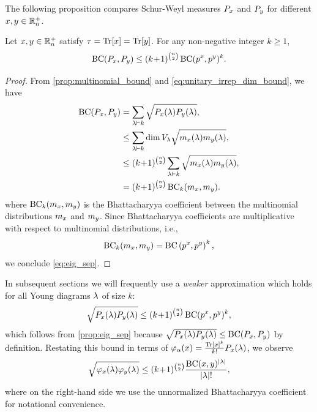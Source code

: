 \documentclass[notitlepage, 11pt, letterpaper]{amsart}
\begin{document}
The following proposition compares Schur-Weyl measures $P_{x}$ and $P_{y}$ for different $x, y \in \mathbb R^{+}_{n}$.
\begin{prop}
    \label{prop:eig_sep}
    Let $x, y \in \mathbb R_n^{+}$ satisfy $\tau = \operatorname{Tr}[x] = \operatorname{Tr}[y]$.
    For any non-negative integer $k\geq 1$,
    \begin{equation}
        \label{eq:eig_sep}
        \operatorname{BC}(P_{x}, P_{y}) \leq (k\!+\!1)^{\binom{n}{2}} \operatorname{BC}(p^x,p^y)^{k}.
    \end{equation}
\end{prop}
\begin{proof}
    From \cref{prop:multinomial_bound} and \cref{eq:unitary_irrep_dim_bound}, we have
    \begin{align}
        \begin{split}
            \operatorname{BC}(P_{x},P_{y}) 
            &= \sum_{\lambda \vdash k} \sqrt{P_{x}(\lambda)P_{y}(\lambda)}, \\
            &\leq \sum_{\lambda \vdash k} \dim V_{\lambda} \sqrt{m_x(\lambda)m_y(\lambda)}, \\
            &\leq (k\!+\!1)^{\binom{n}{2}} \sum_{\lambda \vdash k}\sqrt{m_x(\lambda)m_y(\lambda)}, \\
            &= (k\!+\!1)^{\binom{n}{2}} \operatorname{BC}_k(m_x,m_y).
        \end{split}
    \end{align}
    where $\operatorname{BC}_k(m_x,m_y)$ is the Bhattacharyya coefficient between the multinomial distributions $m_{x}$ and $m_{y}$.
    Since Bhattacharyya coefficients are multiplicative with respect to multinomial distributions, i.e.,
    \begin{equation}
        \operatorname{BC}_k(m_x, m_y) = \operatorname{BC}\left(p^{x}, p^{y}\right)^{k},
    \end{equation}
    we conclude \cref{eq:eig_sep}.
\end{proof}
In subsequent sections we will frequently use a \textit{weaker} approximation which holds for all Young diagrams $\lambda$ of size $k$:
\begin{equation}
    \sqrt{P_{x}(\lambda)P_{y}(\lambda)} \leq (k\!+\!1)^{\binom{n}{2}} \operatorname{BC}(p^{x},p^{y})^{k},
\end{equation}
which follows from \cref{prop:eig_sep} because $\sqrt{P_{x}(\lambda)P_{y}(\lambda)} \leq \operatorname{BC}(P_{x}, P_{y})$ by definition.
Restating this bound in terms of $\varphi_{\alpha}(x) = \frac{\operatorname{Tr}[x]^{k}}{k!}P_{x}(\lambda)$, we observe
\begin{equation}
    \label{eq:weak_eig_sep_varphi}
    \sqrt{\varphi_{x}(\lambda)\varphi_{y}(\lambda)} \leq (k\!+\!1)^{\binom{n}{2}} \frac{\operatorname{BC}(x,y)^{|\lambda|}}{|\lambda|!},
\end{equation}
where on the right-hand side we use the unnormalized Bhattacharyya coefficient for notational convenience.
\end{document}
